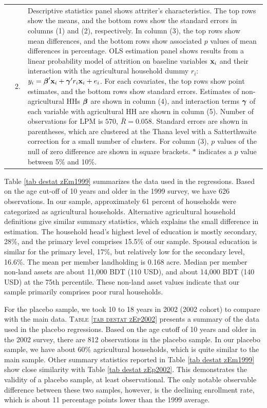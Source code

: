 \documentclass[12pt,letterpaper]{article}\usepackage[margin=1in]{geometry}
\newcommand{\bfbeta}{\ensuremath{\mbox{\boldmath $\beta$}}}
\newcommand{\bfgamma}{\ensuremath{\mbox{\boldmath $\gamma$}}}
\newcommand{\bfx}{\ensuremath{\mbox{\bf x}}}
\newcommand{\0}{\ensuremath{\mbox{\boldmath $0$}}}
\begin{document}
\begin{table}[bp]
\begin{minipage}[t]{14cm}
\begin{tabular}{>{\hfill\scriptsize}p{1cm}<{}>{\hfill\scriptsize}p{.25cm}<{}>{\scriptsize}p{13.75cm}<{\hfill}}
& 2. & \textsf{Descriptive statistics} panel shows attriter's characteristics. The top rows show the means, and the bottom rows show the standard errors in columns (1) and (2), respectively. In column (3), the top rows show mean differences, and the bottom rows show associated $p$ values of mean differences in percentage. \textsf{OLS estimation} panel shows results from a linear probability model of attrition on baseline variables $\bfx_{i}$ and their interaction with the agricultural household dummy $r_{i}$: $y_{i}=\bfbeta'\bfx_{i}+\bfgamma'r_{i}\bfx_{i}+e_{i}$. For each covariates, the top rows show point estimates, and the bottom rows show standard errors. Estimates of non-agricultural HHs $\bfbeta$ are shown in column (4), and interaction terms $\bfgamma$ of each variable with agricultural HH are shown in column (5). Number of observations for LPM is $570$, $\bar{R}=0.058$. Standard errors are shown in parentheses, which are clustered at the Thana level with a Satterthwaite correction for a small number of clusters. For column (3), $p$ values of the null of zero difference are shown in square brackets. $*$ indicates a $p$ value between 5\% and 10\%. 
\end{tabular}
\end{minipage}
\end{table}

Table \ref{tab destat zEm1999} summarizes the data used in the regressions. Based on the age cut-off of 10 years and older in the 1999 survey, we have 626 observations. In our sample, approximately 61 percent of households were categorized as agricultural households. Alternative agricultural household definitions give similar summary statistics, which explains the small difference in estimation. The household head's highest level of education is mostly secondary, 28\%, and the primary level comprises 15.5\% of our sample. Spousal education is similar for the primary level, 17\%, but relatively low for the secondary level, 16.6\%. The mean per member landholding is 0.168 acre. Median per member non-land assets are about 11,000 BDT (110 USD), and about 14,000 BDT (140 USD) at the 75th percentile. These non-land asset values indicate that our sample primarily comprises poor rural households.

For the placebo sample, we took 10 to 18 years in 2002 (2002 cohort) to compare with the main data. \textsc{Table \ref{tab destat zEp2002}} presents a summary of the data used in the placebo regressions. Based on the age cutoff of 10 years and older in the 2002 survey, there are 812 observations in the placebo sample. In our placebo sample, we have about 60\% agricultural households, which is quite similar to the main sample. Other summary statistics reported in Table \ref{tab destat zEm1999} show close similarity with Table \ref{tab destat zEp2002}. This demonstrates the validity of a placebo sample, at least observational. The only notable observable difference between these two samples, however, is the declining enrollment rate, which is about 11 percentage points lower than the 1999 average.
\end{document}
